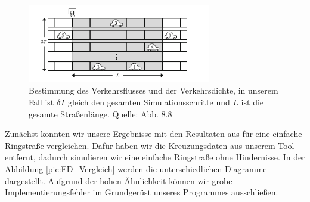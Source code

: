 \begin{figure}[H]%
\centering
\includegraphics[width=8cm]{4_BestFD.png}%
\caption[Messung von Fluss und Dichte in der Simulation]{Bestimmung des Verkehrsflusses und der Verkehrsdichte, in unserem Fall ist $\delta T$ gleich den gesamten Simulationsschritte und $L$ ist die gesamte Straßenlänge. Quelle: \cite{book:bungartz} Abb. 8.8}%
\label{pic:FD_Skizze}%
\end{figure}
\noindent
Zunächst konnten wir unsere Ergebnisse mit den Resultaten aus \cite{book:bungartz} für eine einfache Ringstraße vergleichen. Dafür haben wir die Kreuzungsdaten aus unserem Tool entfernt, dadurch simulieren wir eine einfache Ringstraße ohne Hindernisse. In der Abbildung \ref{pic:FD_Vergleich} werden die unterschiedlichen Diagramme dargestellt. Aufgrund der hohen Ähnlichkeit können wir grobe Implementierungsfehler im Grundgerüst unseres Programmes ausschließen.

